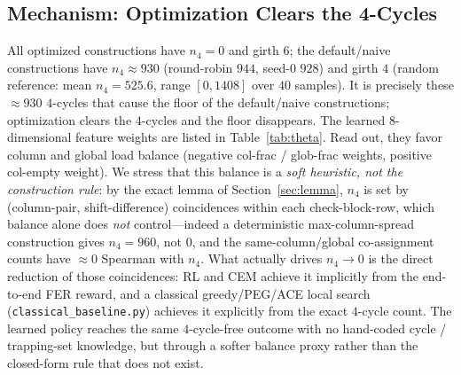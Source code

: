 \documentclass[journal]{IEEEtran}
\begin{document}
\subsection{Mechanism: Optimization Clears the 4-Cycles}
\label{sec:results-mech}
All optimized constructions have $n_4=0$ and girth $6$; the default/naive
constructions have $n_4\approx930$ (round-robin $944$, seed-0 $928$) and girth
$4$ (random reference: mean $n_4 = 525.6$, range $[0,1408]$ over $40$ samples).
It is precisely these $\approx\!930$ $4$-cycles that cause the floor of the
default/naive constructions; optimization clears the $4$-cycles and the floor
disappears. The learned $8$-dimensional feature weights are listed in
Table~\ref{tab:theta}. Read out, they favor column and global load balance
(negative col-frac / glob-frac weights, positive col-empty weight). We stress
that this balance is a \emph{soft heuristic, not the construction rule}: by the
exact lemma of Section~\ref{sec:lemma}, $n_4$ is set by (column-pair,
shift-difference) coincidences within each check-block-row, which balance alone
does \emph{not} control---indeed a deterministic max-column-spread construction
gives $n_4=960$, not $0$, and the same-column/global co-assignment counts have
$\approx\!0$ Spearman with $n_4$. What actually drives $n_4\to0$ is the direct
reduction of those coincidences: RL and CEM achieve it implicitly from the
end-to-end FER reward, and a classical greedy/PEG/ACE local search
(\texttt{classical\_baseline.py}) achieves it explicitly from the exact $4$-cycle
count. The learned policy reaches the same $4$-cycle-free outcome with no
hand-coded cycle / trapping-set knowledge, but through a softer balance proxy
rather than the closed-form rule that does not exist.
\end{document}
